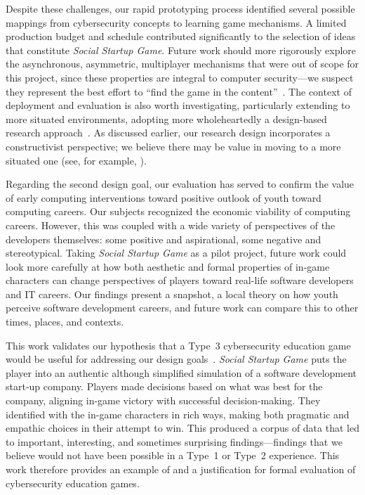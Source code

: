 \documentclass[letterpaper]{article}
\begin{document}
Despite these challenges, our rapid prototyping process identified
several possible mappings from cybersecurity concepts to learning game
mechanisms.  A limited production budget and schedule contributed
significantly to the selection of ideas that constitute \textit{Social
  Startup Game}.  Future work should more rigorously explore the
asynchronous, asymmetric, multiplayer mechanisms that were out of
scope for this project, since these properties are integral to
computer security---we suspect they represent the best effort to
``find the game in the content''~\citep{Klopfer2009}.  The context of
deployment and evaluation is also worth investigating, particularly
extending to more situated environments, adopting more wholeheartedly
a design-based research approach~\citep{Brown1992,Barab2004}.  As
discussed earlier, our research design incorporates a constructivist
perspective; we believe there may be value in moving to a more
situated one (see, for example, \citet{Greeno1998, Hickey2003}).

Regarding the second design goal, our evaluation has served to 
confirm the value of early computing interventions toward positive
outlook of youth toward computing careers.
Our subjects recognized the economic viability of computing careers.
However, this was coupled with a wide variety of perspectives
of the developers themselves: some positive and aspirational, some
negative and stereotypical.
Taking \textit{Social Startup Game} as a pilot project, future work
could look more carefully at how both aesthetic and formal properties
of in-game characters can change perspectives of players toward
real-life software developers and IT careers.
Our findings present a snapshot, a local theory on how youth perceive
software development careers, and future work can compare this to 
other times, places, and contexts.

This work validates our hypothesis that a Type~3 cybersecurity
education game would be useful for addressing our design
goals~\citep{Gestwicki2015}. 
\textit{Social Startup Game} puts the player into an authentic 
although simplified simulation of a software development start-up company.
Players made decisions based on what was best for the company, 
aligning in-game victory with successful decision-making.
They identified with the in-game characters in rich ways, making
both pragmatic and empathic choices in their attempt to win.
This produced a corpus of data that led to important, interesting, and
sometimes surprising findings---findings that we believe would not have
been possible in a Type~1 or Type~2 experience.
This work therefore provides an example of and a justification for
formal evaluation of cybersecurity education games. 
\end{document}
